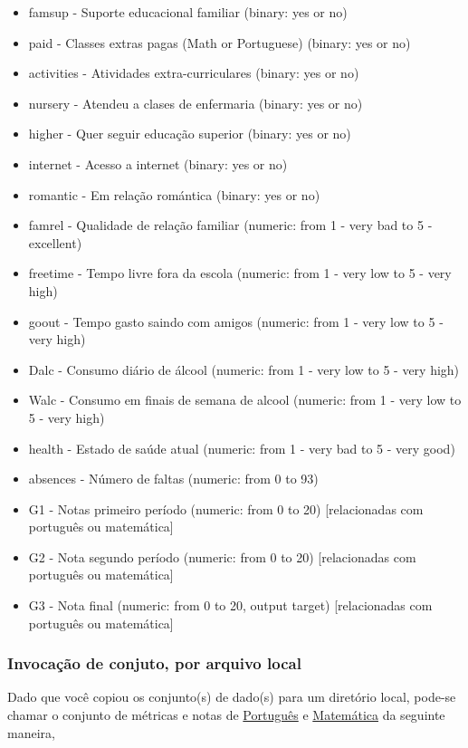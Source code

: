 \documentclass[11pt]{article}
\begin{document}
\begin{itemize}
\begin{itemize}
\item famsup - Suporte educacional familiar (binary: yes or no)
\item paid - Classes extras pagas (Math or Portuguese) (binary: yes or no)
\item activities - Atividades extra-curriculares (binary: yes or no)
\item nursery - Atendeu a clases de enfermaria (binary: yes or no)
\item higher - Quer seguir educação superior (binary: yes or no)
\item internet - Acesso a internet (binary: yes or no)
\item romantic - Em relação romántica (binary: yes or no)
\item famrel - Qualidade de relação familiar (numeric: from 1 - very bad to 5 - excellent)
\item freetime - Tempo livre fora da escola (numeric: from 1 - very low to 5 - very high)
\item goout - Tempo gasto saindo com amigos (numeric: from 1 - very low to 5 - very high)
\item Dalc - Consumo diário de álcool (numeric: from 1 - very low to 5 - very high)
\item Walc - Consumo em finais de semana de alcool (numeric: from 1 - very low to 5 - very high)
\item health - Estado de saúde atual (numeric: from 1 - very bad to 5 - very good)
\item absences - Número de faltas (numeric: from 0 to 93)
\item G1 - Notas primeiro período (numeric: from 0 to 20) [relacionadas com português ou matemática]
\item G2 - Nota segundo período (numeric: from 0 to 20) [relacionadas com português ou matemática]
\end{itemize}
\end{itemize}

\begin{itemize}
\item G3 - Nota final (numeric: from 0 to 20, output target) [relacionadas com português ou matemática]
\end{itemize}
\subsubsection{Invocação de conjuto, por arquivo local}
\label{sec:org68a7d9b}

Dado que você copiou os conjunto(s) de dado(s) para um diretório
local, pode-se chamar o conjunto de métricas e notas de \href{https://drive.google.com/file/d/1vrIpfxXLxqo4ngPDOBjyrJFhB-Ei5N4C/view?usp=sharing}{Português} e \href{https://drive.google.com/file/d/1FO2LEQhKbCX8cq6yBxqKzjrbnR18OxSD/view?usp=sharing}{Matemática} da seguinte maneira,
\end{document}
